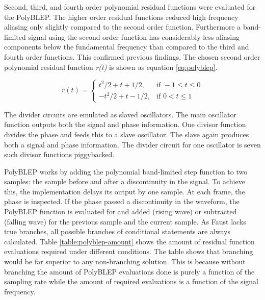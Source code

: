 \documentclass[11pt,a4paper]{article}
\begin{document}
Second, third, and fourth order polynomial residual functions were evaluated for the PolyBLEP. The higher order residual functions reduced high frequency aliasing only slightly compared to the second order function. Furthermore a band-limited signal using the second order function has considerably less aliasing components below the fundamental frequency than compared to the third and fourth order functions. This confirmed previous findings\cite{pekonen}. The chosen second order polynomial residual function \emph{r(t)} is shown as equation \ref{eq:polyblep}.

\begin{equation}
\label{eq:polyblep}
r(t) = \begin{cases} 	t^2/2  + t + 1/2, & \mbox{if } -1 \leq t \leq 0\\ 
			-t^2/2 + t - 1/2, & \mbox{if } 0 < t \leq 1 \end{cases}
\end{equation}

The divider circuits are emulated as slaved oscillators. The main oscillator function outputs both the signal and phase information. One divisor function divides the phase and feeds this to a slave oscillator. The slave again produces both a signal and phase information. The divider circuit for one oscillator is seven such divisor functions piggybacked.

PolyBLEP works by adding the polynomial band-limited step function to two samples: the sample before and after a discontinuity in the signal. To achieve this, the implementation delays its output by one sample. At each frame, the phase is inspected. If the phase passed a discontinuity in the waveform, the PolyBLEP function is evaluated for and added (rising wave) or subtracted (falling wave) for the previous sample and the current sample. As Faust lacks true branches, all possible branches of conditional statements are always calculated. Table \ref{table:polyblep-amount} shows the amount of residual function evaluations required under different conditions. The table shows that branching would be far superior to any non-branching solution. This is because without branching the amount of PolyBLEP evaluations done is purely a function of the sampling rate while the amount of required evaluations is a function of the signal frequency. 
\end{document}
